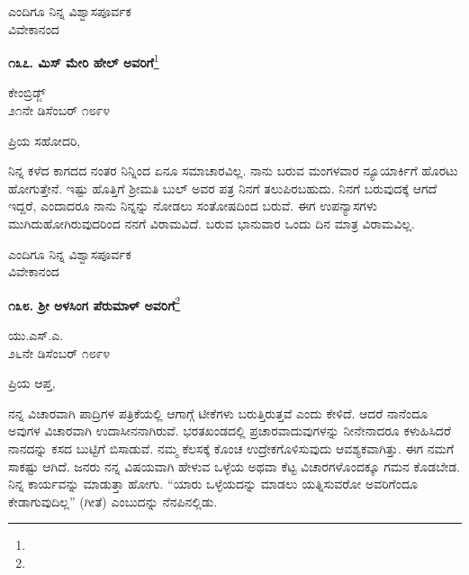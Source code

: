 \vspace{-0.4cm}

{\flushright
ಎಂದಿಗೂ ನಿನ್ನ ವಿಶ್ವಾಸಪೂರ್ವಕ\\ವಿವೇಕಾನಂದ\par}

\begin{center}
\textbf{೧೩೭. ಮಿಸ್ ಮೇರಿ ಹೇಲ್ ಅವರಿಗೆ}\footnote{}
\end{center}

\vspace{-0.7cm}

\begin{flushright}
ಕೇಂಬ್ರಿಡ್ಜ್\\೨೧ನೇ ಡಿಸೆಂಬರ್ ೧೮೯೪
\end{flushright}

\vspace{-0.6cm}

\noindent
ಪ್ರಿಯ ಸಹೋದರಿ,

ನಿನ್ನ ಕಳೆದ ಕಾಗದದ ನಂತರ ನಿನ್ನಿಂದ ಏನೂ ಸಮಾಚಾರವಿಲ್ಲ. ನಾನು ಬರುವ ಮಂಗಳವಾರ ನ್ಯೂಯಾರ್ಕಿಗೆ ಹೊರಟು ಹೋಗುತ್ತೇನೆ. ಇಷ್ಟು ಹೊತ್ತಿಗೆ ಶ‍್ರೀಮತಿ ಬುಲ್ ಅವರ ಪತ್ರ ನಿನಗೆ ತಲುಪಿರಬಹುದು. ನಿನಗೆ ಬರುವುದಕ್ಕೆ ಆಗದೆ ಇದ್ದರೆ, ಎಂದಾದರೂ ನಾನು ನಿನ್ನನ್ನು ನೋಡಲು ಸಂತೋಷದಿಂದ ಬರುವೆ. ಈಗ ಉಪನ್ಯಾಸಗಳು ಮುಗಿದುಹೋಗಿರುವುದರಿಂದ ನನಗೆ ವಿರಾಮವಿದೆ. ಬರುವ ಭಾನುವಾರ ಒಂದು ದಿನ ಮಾತ್ರ ವಿರಾಮವಿಲ್ಲ.

\vspace{-0.6cm}

{\flushright
ಎಂದಿಗೂ ನಿನ್ನ ವಿಶ್ವಾಸಪೂರ್ವಕ\\ವಿವೇಕಾನಂದ\par}

\begin{center}
\textbf{೧೩೮. ಶ‍್ರೀ ಅಳಸಿಂಗ ಪೆರುಮಾಳ್ ಅವರಿಗೆ}\footnote{}
\end{center}

\vspace{-0.7cm}

\begin{flushright}
ಯು.ಎಸ್.ಎ.\\೨೬ನೇ ಡಿಸೆಂಬರ್ ೧೮೯೪
\end{flushright}

\vspace{-0.6cm}

\noindent
ಪ್ರಿಯ ಆಪ್ತ,

ನನ್ನ ವಿಚಾರವಾಗಿ ಪಾದ್ರಿಗಳ ಪತ್ರಿಕೆಯಲ್ಲಿ ಆಗಾಗ್ಗೆ ಟೀಕೆಗಳು ಬರುತ್ತಿರುತ್ತವೆ ಎಂದು ಕೇಳಿದೆ. ಆದರೆ ನಾನೆಂದೂ ಅವುಗಳ ವಿಚಾರವಾಗಿ ಉದಾಸೀನನಾಗಿರುವೆ. ಭರತಖಂಡ\break ದಲ್ಲಿ ಪ್ರಚಾರವಾದುವುಗಳನ್ನು ನೀನೇನಾದರೂ ಕಳುಹಿಸಿದರೆ ನಾನದನ್ನು ಕಸದ ಬುಟ್ಟಿಗೆ ಬಿಸಾಡುವೆ. ನಮ್ಮ ಕೆಲಸಕ್ಕೆ ಕೊಂಚ ಉದ್ರೇಕಗೊಳಿಸುವುದು ಆವಶ್ಯಕವಾಗಿತ್ತು. ಈಗ ನಮಗೆ ಸಾಕಷ್ಟು ಆಗಿದೆ. ಜನರು ನನ್ನ ವಿಷಯವಾಗಿ ಹೇಳುವ ಒಳ್ಳೆಯ ಅಥವಾ ಕೆಟ್ಟ ವಿಚಾರಗಳೊಂದಕ್ಕೂ ಗಮನ ಕೊಡಬೇಡ. ನಿನ್ನ ಕಾರ್ಯವನ್ನು ಮಾಡುತ್ತಾ ಹೋಗು. ``ಯಾರು ಒಳ್ಳೆಯದನ್ನು ಮಾಡಲು ಯತ್ನಿಸುವರೋ ಅವರಿಗೆಂದೂ ಕೇಡಾಗುವುದಿಲ್ಲ” (ಗೀತೆ) ಎಂಬುದನ್ನು ನೆನಪಿನಲ್ಲಿಡು.

